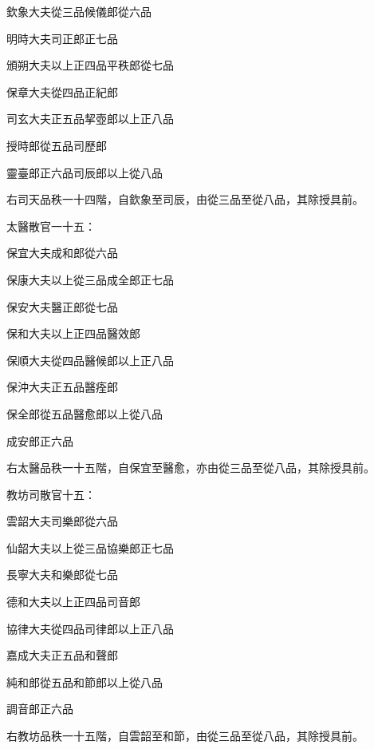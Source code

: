 \begin{pinyinscope}
 欽象大夫從三品候儀郎從六品



 明時大夫司正郎正七品



 頒朔大夫以上正四品平秩郎從七品



 保章大夫從四品正紀郎



 司玄大夫正五品挈壺郎以上正八品



 授時郎從五品司歷郎



 靈臺郎正六品司辰郎以上從八品



 右司天品秩一十四階，自欽象至司辰，由從三品至從八品，其除授具前。



 太醫散官一十五：



 保宜大夫成和郎從六品



 保康大夫以上從三品成全郎正七品



 保安大夫醫正郎從七品



 保和大夫以上正四品醫效郎



 保順大夫從四品醫候郎以上正八品



 保沖大夫正五品醫痊郎



 保全郎從五品醫愈郎以上從八品



 成安郎正六品



 右太醫品秩一十五階，自保宜至醫愈，亦由從三品至從八品，其除授具前。



 教坊司散官十五：



 雲韶大夫司樂郎從六品



 仙韶大夫以上從三品協樂郎正七品



 長寧大夫和樂郎從七品



 德和大夫以上正四品司音郎



 協律大夫從四品司律郎以上正八品



 嘉成大夫正五品和聲郎



 純和郎從五品和節郎以上從八品



 調音郎正六品



 右教坊品秩一十五階，自雲韶至和節，由從三品至從八品，其除授具前。



\end{pinyinscope}